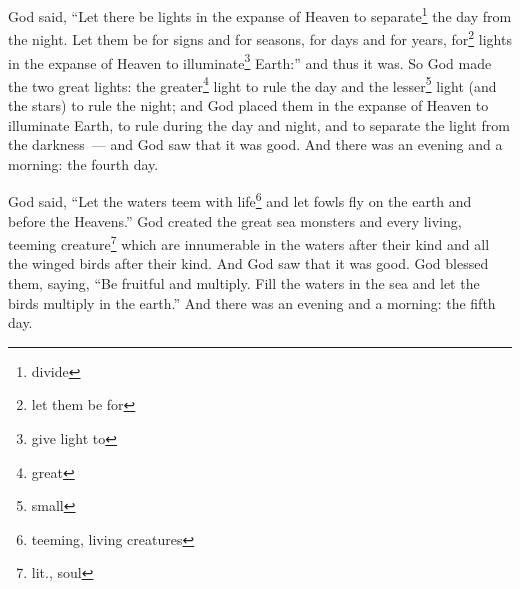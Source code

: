\begin{inparaenum}
     God said, ``Let there be lights in the expanse of Heaven to separate\footnote{divide} the day from the night. Let them be for signs and for seasons, for days and for years,%
     for\footnote{let them be for} lights in the expanse of Heaven to illuminate\footnote{give light to} Earth:'' and thus it was.%
     So God made the two great lights: the greater\footnote{great} light to rule the day and the lesser\footnote{small} light (and the stars) to rule the night;%
     and God placed them in the expanse of Heaven to illuminate Earth,%
     to rule during the day and night, and to separate the light from the darkness~--- and God saw that it was good.%
     And there was an evening and a morning: the fourth day.%
    
     God said, ``Let the waters teem with life\footnote{teeming, living creatures} and let fowls fly on the earth and before the Heavens.''%
     God created the great sea monsters and every living, teeming creature\footnote{lit., soul} which are innumerable in the waters after their kind and all the winged birds after their kind. And God saw that it was good.%
     God blessed them, saying, ``Be fruitful and multiply. Fill the waters in the sea and let the birds multiply in the earth.''%
     And there was an evening and a morning: the fifth day.%
    

\end{inparaenum}
